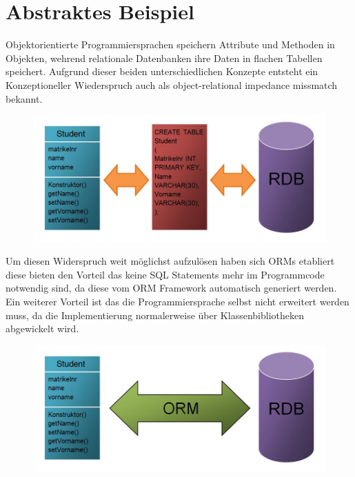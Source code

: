 
\chapter{Abstraktes Beispiel} %

\label{Chapter2} %

Objektorientierte Programmiersprachen speichern Attribute und Methoden in Objekten, wehrend relationale Datenbanken ihre Daten in flachen Tabellen speichert. Aufgrund dieser beiden unterschiedlichen Konzepte entsteht ein Konzeptioneller Wiederspruch auch als object-relational impedance missmatch bekannt.

\begin{figure}[h]
\begin{center}
\includegraphics[width=1.0\textwidth]{ORM_Bild1.jpg}
\end{center}
\end{figure}

\newpage
Um diesen Widerspruch weit möglichst aufzulösen haben sich ORMs etabliert diese bieten den Vorteil das keine SQL Statements mehr im Programmcode notwendig sind, da diese vom ORM Framework automatisch generiert werden. Ein weiterer Vorteil ist das die Programmiersprache selbst nicht erweitert werden muss, da die Implementierung normalerweise über Klassenbibliotheken abgewickelt wird.

\begin{figure}[h]
\begin{center}
\includegraphics[width=1.0\textwidth]{ORM_Bild2.jpg}
\end{center}
\end{figure}
